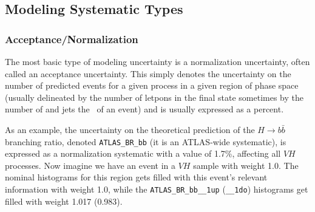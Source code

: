\subsection{Modeling Systematic Types}
\subsubsection{Acceptance/Normalization}
The most basic type of modeling uncertainty is a normalization uncertainty, often called an acceptance uncertainty.  This simply denotes the uncertainty on the number of predicted events for a given process in a given region of phase space (usually delineated by the number of letpons in the final state sometimes by the number of and jets the \ptv\, of an event) and is usually expressed as a percent.  

As an example, the uncertainty on the theoretical prediction of the $H\to b\bar{b}$ branching ratio, denoted \texttt{ATLAS\_BR\_bb} (it is an ATLAS-wide systematic), is expressed as a normalization systematic with a value of 1.7\%, affecting all $VH$ processes.  Now imagine we have an event in a $VH$ sample with weight 1.0.  The nominal histograms for this region gets filled with this event's relevant information with weight 1.0, while the \texttt{ATLAS\_BR\_bb\_\_1up} (\texttt{\_\_1do}) histograms get filled with weight 1.017 (0.983).


